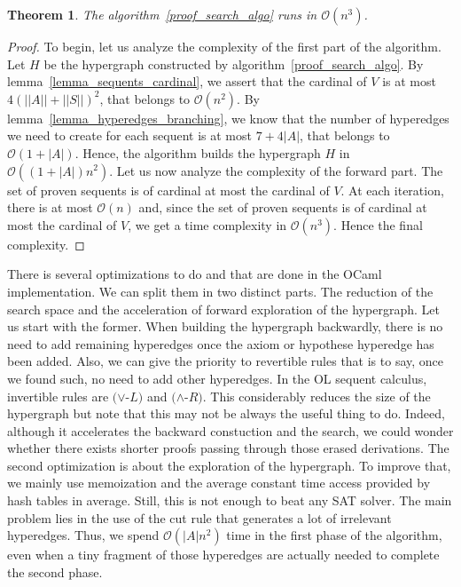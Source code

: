 \documentclass[a4paper, 11pt]{article}
\newtheorem{theorem}{Theorem}
\begin{document}
    \begin{theorem}\label{theorem_algo_complexity}
	    The algorithm~\ref{proof_search_algo} runs in $\mathcal{O}(n^3)$.
    \end{theorem}
    \begin{proof}
	    To begin, let us analyze the complexity of the first part of the algorithm. 
	    Let $H$ be the hypergraph constructed by algorithm~\ref{proof_search_algo}. By 
	    lemma~\ref{lemma_sequents_cardinal}, we assert that the cardinal of $V$ is at most 
	    $4(||A||+||S||)^2$, that belongs to $\mathcal{O}(n^2)$. By 
	    lemma~\ref{lemma_hyperedges_branching}, we know that the number
	    of hyperedges we need to create for each sequent is at most $7+4|A|$, that belongs to 
	    $\mathcal{O}(1+|A|)$.
	    Hence, the algorithm builds the hypergraph $H$ in $\mathcal{O}((1+|A|)n^2)$. Let us now 
	    analyze the complexity of the forward part. The set of proven sequents is of cardinal at 
	    most the cardinal of $V$. At each iteration, there is at most $\mathcal{O}(n)$ and, since
	    the set of proven sequents is of cardinal at most the cardinal of $V$, we get a time 
	    complexity in $\mathcal{O}(n^3)$. Hence the final complexity. 
    \end{proof}
    There is several optimizations to do and that are done in the OCaml implementation. We can split
    them in two distinct parts. The reduction of the search space and the acceleration of forward
    exploration of the hypergraph. Let us start with the former. When building the hypergraph backwardly,
    there is no need to add remaining hyperedges once the axiom or hypothese hyperedge has been added.
    Also, we can give the priority to revertible rules that is to say, once we found such, no need
    to add other hyperedges. In the OL sequent calculus, invertible rules are $(\vee$-$L)$ and 
    $(\wedge$-$R)$. This considerably reduces the size of the hypergraph but note that this may not be
    always the useful thing to do. Indeed, although it accelerates the backward constuction and the 
    search, we could wonder whether there exists shorter proofs passing 
    through those erased derivations. The second optimization is about the exploration of the
    hypergraph. To improve that, we mainly use memoization and the average constant time access provided
    by hash tables in average.
    Still, this is not enough to beat any SAT solver. The main problem lies in the use of the cut
    rule that generates a lot of irrelevant hyperedges. Thus, we spend $\mathcal{O}(|A|n^2)$ time
    in the first phase of the algorithm, even when a tiny fragment of those hyperedges are actually
    needed to complete the second phase.
\end{document}
